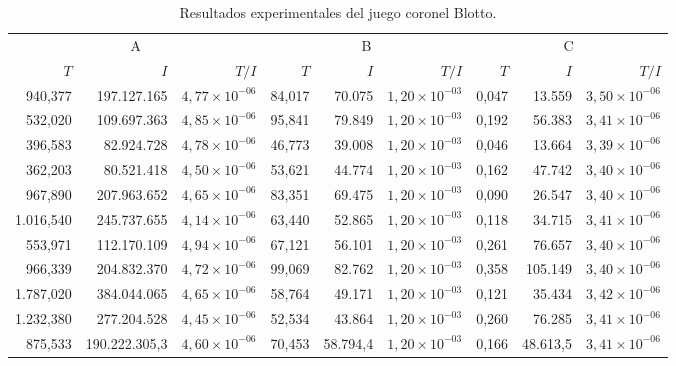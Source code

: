 \begin{table}[h]
    \centering
    \caption{Resultados experimentales del juego coronel Blotto.}
    \label{tab:resultados-coronel-blotto}
    \scriptsize
    \begin{tabular}{r r r r r r r r r}
    \toprule
    \multicolumn{3}{c}{A} & \multicolumn{3}{c}{B} & \multicolumn{3}{c}{C} \\ \cmidrule(r){1-3} \cmidrule(lr){4-6} \cmidrule(l){7-9}
    $T$ & $I$ & $T/I$ & $T$ & $I$ & $T/I$ & $T$ & $I$ & $T/I$ \\  \cmidrule(r){1-3} \cmidrule(lr){4-6} \cmidrule(l){7-9}
      940,377 & 197.127.165   & $4,77 {\times} 10^{-06}$ & 84,017 & 70.075   & $1,20 {\times} 10^{-03}$ & 0,047 &  13.559   & $3,50 {\times} 10^{-06}$ \\
      532,020 & 109.697.363   & $4,85 {\times} 10^{-06}$ & 95,841 & 79.849   & $1,20 {\times} 10^{-03}$ & 0,192 &  56.383   & $3,41 {\times} 10^{-06}$ \\
      396,583 &  82.924.728   & $4,78 {\times} 10^{-06}$ & 46,773 & 39.008   & $1,20 {\times} 10^{-03}$ & 0,046 &  13.664   & $3,39 {\times} 10^{-06}$ \\
      362,203 &  80.521.418   & $4,50 {\times} 10^{-06}$ & 53,621 & 44.774   & $1,20 {\times} 10^{-03}$ & 0,162 &  47.742   & $3,40 {\times} 10^{-06}$ \\
      967,890 & 207.963.652   & $4,65 {\times} 10^{-06}$ & 83,351 & 69.475   & $1,20 {\times} 10^{-03}$ & 0,090 &  26.547   & $3,40 {\times} 10^{-06}$ \\
    1.016,540 & 245.737.655   & $4,14 {\times} 10^{-06}$ & 63,440 & 52.865   & $1,20 {\times} 10^{-03}$ & 0,118 &  34.715   & $3,41 {\times} 10^{-06}$ \\
      553,971 & 112.170.109   & $4,94 {\times} 10^{-06}$ & 67,121 & 56.101   & $1,20 {\times} 10^{-03}$ & 0,261 &  76.657   & $3,40 {\times} 10^{-06}$ \\
      966,339 & 204.832.370   & $4,72 {\times} 10^{-06}$ & 99,069 & 82.762   & $1,20 {\times} 10^{-03}$ & 0,358 & 105.149   & $3,40 {\times} 10^{-06}$ \\
    1.787,020 & 384.044.065   & $4,65 {\times} 10^{-06}$ & 58,764 & 49.171   & $1,20 {\times} 10^{-03}$ & 0,121 &  35.434   & $3,42 {\times} 10^{-06}$ \\
    1.232,380 & 277.204.528   & $4,45 {\times} 10^{-06}$ & 52,534 & 43.864   & $1,20 {\times} 10^{-03}$ & 0,260 &  76.285   & $3,41 {\times} 10^{-06}$ \\ \cmidrule(r){1-3} \cmidrule(lr){4-6} \cmidrule(l){7-9}
      875,533 & 190.222.305,3 & $4,60 {\times} 10^{-06}$ & 70,453 & 58.794,4 & $1,20 {\times} 10^{-03}$ & 0,166 &  48.613,5 & $3,41 {\times} 10^{-06}$ \\ \bottomrule
    \end{tabular}
\end{table}
